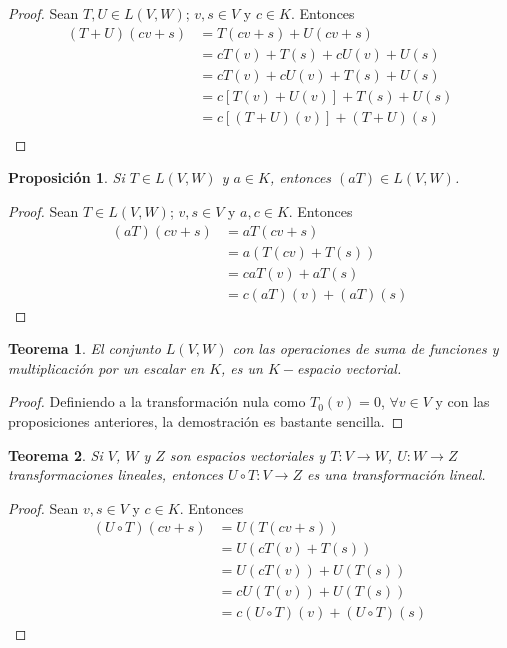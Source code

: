 \documentclass{book}
\newtheorem{theorem}{Teorema}
\newtheorem{proposition}{Proposición}
\begin{document}
\begin{proof}
Sean $T,U \in L(V,W)$; $v,s \in V$ y $c \in K$. Entonces
\[
\begin{split}
(T+U)(cv+s) &= T(cv+s)+U(cv+s) \\
&=cT(v)+T(s)+cU(v)+U(s) \\
&=cT(v)+cU(v)+T(s)+U(s) \\
&=c[T(v)+U(v)]+T(s)+U(s) \\
&=c[(T+U)(v)]+(T+U)(s) \\
\end{split}
\]
\end{proof}

\begin{proposition}
Si $T\in L(V,W)$ y $a\in K$, entonces $(aT)\in L(V,W)$.
\end{proposition}

\begin{proof}
Sean $T\in L(V,W)$; $v,s\in V$ y $a,c\in K$. Entonces
\[
\begin{split}
(aT)(cv+s) &=aT(cv+s) \\
&=a(T(cv)+T(s)) \\
&=caT(v)+aT(s) \\
&=c(aT)(v)+(aT)(s)
\end{split}
\]
\end{proof}

\begin{theorem}
El conjunto $L(V,W)$ con las operaciones de suma de funciones y multiplicación por un escalar en $K$, es un $K-$espacio vectorial.
\end{theorem}

\begin{proof}
Definiendo a la transformación nula como $T_0(v)=0$, $\forall v \in V$ y con las proposiciones anteriores, la demostración es bastante sencilla.
\end{proof}

\begin{theorem}
Si $V$, $W$ y $Z$ son espacios vectoriales y $T:V \rightarrow W$, $U:W \rightarrow Z$ transformaciones lineales, entonces $U\circ T:V \rightarrow Z$ es una transformación lineal.
\end{theorem}

\begin{proof}
Sean $v,s\in V$ y $c\in K$. Entonces
\[
\begin{split}
(U\circ T)(cv+s) &=U(T(cv+s)) \\
&=U(cT(v)+T(s)) \\
&=U(cT(v))+U(T(s)) \\
&=cU(T(v))+U(T(s)) \\
&=c(U \circ T)(v)+(U\circ T)(s)
\end{split}
\]
\end{proof}
\end{document}
